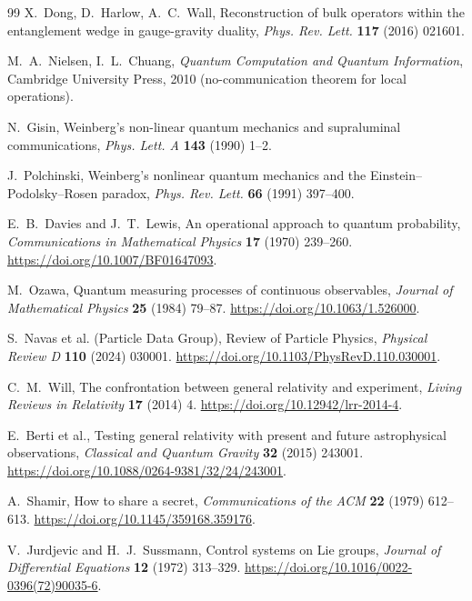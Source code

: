 \documentclass[11pt]{article}
\theoremstyle{definition}
\begin{document}
\begin{thebibliography}{99}
X.~Dong, D.~Harlow, A.~C.~Wall, Reconstruction of bulk operators within the
entanglement wedge in gauge-gravity duality, \emph{Phys. Rev. Lett.} \textbf{117}
(2016) 021601.

M.~A.~Nielsen, I.~L.~Chuang, \emph{Quantum Computation and Quantum Information},
Cambridge University Press, 2010 (no-communication theorem for local operations).

N.~Gisin, Weinberg's non-linear quantum mechanics and supraluminal communications,
\emph{Phys. Lett. A} \textbf{143} (1990) 1--2.

J.~Polchinski, Weinberg's nonlinear quantum mechanics and the
Einstein--Podolsky--Rosen paradox, \emph{Phys. Rev. Lett.} \textbf{66} (1991)
397--400.



E.~B.~Davies and J.~T.~Lewis, An operational approach to quantum probability,
\emph{Communications in Mathematical Physics} \textbf{17} (1970) 239--260.
\url{https://doi.org/10.1007/BF01647093}.

M.~Ozawa, Quantum measuring processes of continuous observables,
\emph{Journal of Mathematical Physics} \textbf{25} (1984) 79--87.
\url{https://doi.org/10.1063/1.526000}.

S.~Navas et al. (Particle Data Group), Review of Particle Physics,
\emph{Physical Review D} \textbf{110} (2024) 030001.
\url{https://doi.org/10.1103/PhysRevD.110.030001}.

C.~M.~Will, The confrontation between general relativity and experiment,
\emph{Living Reviews in Relativity} \textbf{17} (2014) 4.
\url{https://doi.org/10.12942/lrr-2014-4}.

E.~Berti et al., Testing general relativity with present and future astrophysical
observations, \emph{Classical and Quantum Gravity} \textbf{32} (2015) 243001.
\url{https://doi.org/10.1088/0264-9381/32/24/243001}.

A.~Shamir, How to share a secret,
\emph{Communications of the ACM} \textbf{22} (1979) 612--613.
\url{https://doi.org/10.1145/359168.359176}.

V.~Jurdjevic and H.~J.~Sussmann, Control systems on Lie groups,
\emph{Journal of Differential Equations} \textbf{12} (1972) 313--329.
\url{https://doi.org/10.1016/0022-0396(72)90035-6}.



\end{thebibliography}
\end{document}
